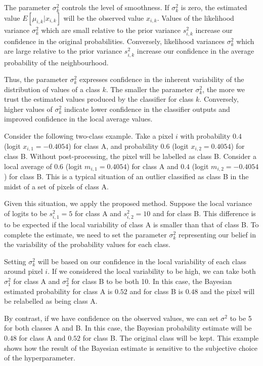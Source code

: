 \documentclass[
  shortnames]{jss}
\begin{document}
The parameter \(\sigma^2_k\) controls the level of smoothness. If \(\sigma^2_k\) is zero, the estimated value \({E}[\mu_{i,k} | x_{i,k}]\) will be the observed value \(x_{i,k}\). Values of the likelihood variance \(\sigma^2_{k}\) which are small relative to the prior variance \(s^2_{i,k}\) increase our confidence in the original probabilities. Conversely, likelihood variances \(\sigma^2_{k}\) which are large relative to the prior variance \(s^2_{i,k}\) increase our confidence in the average probability of the neighbourhood.

Thus, the parameter \(\sigma^2_{k}\) expresses confidence in the inherent variability of the distribution of values of a class \(k\). The smaller the parameter \(\sigma^2_{k}\), the more we trust the estimated values produced by the classifier for class \(k\). Conversely, higher values of \(\sigma^2_{k}\) indicate lower confidence in the classifier outputs and improved confidence in the local average values.

Consider the following two-class example. Take a pixel \(i\) with probability \(0.4\) (logit \(x_{i,1} = -0.4054\)) for class A, and probability \(0.6\) (logit \(x_{i,2} = 0.4054\)) for class B. Without post-processing, the pixel will be labelled as class B. Consider a local average of \(0.6\) (logit \(m_{i,1} = 0.4054\)) for class A and \(0.4\) (logit \(m_{i,2} = -0.4054\)) for class B. This is a typical situation of an outlier classified as class B in the midst of a set of pixels of class A.

Given this situation, we apply the proposed method. Suppose the local variance of logits to be \(s^2_{i,1} = 5\) for class A and \(s^2_{i,2} = 10\) and for class B. This difference is to be expected if the local variability of class A is smaller than that of class B. To complete the estimate, we need to set the parameter \(\sigma^2_{k}\) representing our belief in the variability of the probability values for each class.

Setting \(\sigma^2_{k}\) will be based on our confidence in the local variability of each class around pixel \({i}\). If we considered the local variability to be high, we can take both \(\sigma^2_1\) for class A and \(\sigma^2_2\) for class B to be both 10. In this case, the Bayesian estimated probability for class A is \(0.52\) and for class B is \(0.48\) and the pixel will be relabelled as being class A.

By contrast, if we have confidence on the observed values, we can set \(\sigma^2\) to be 5 for both classes A and B. In this case, the Bayesian probability estimate will be \(0.48\) for class A and \(0.52\) for class B. The original class will be kept. This example shows how the result of the Bayesian estimate is sensitive to the subjective choice of the hyperparameter.
\end{document}
